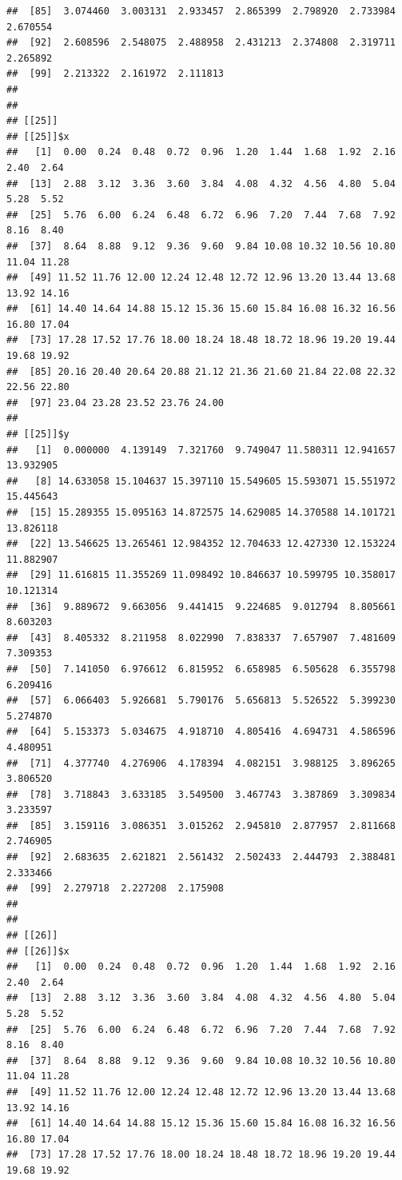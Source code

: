 \documentclass[
  ignorenonframetext,
]{beamer}
\begin{document}
\begin{frame}[fragile]{}
\begin{verbatim}
##  [85]  3.074460  3.003131  2.933457  2.865399  2.798920  2.733984  2.670554
##  [92]  2.608596  2.548075  2.488958  2.431213  2.374808  2.319711  2.265892
##  [99]  2.213322  2.161972  2.111813
## 
## 
## [[25]]
## [[25]]$x
##   [1]  0.00  0.24  0.48  0.72  0.96  1.20  1.44  1.68  1.92  2.16  2.40  2.64
##  [13]  2.88  3.12  3.36  3.60  3.84  4.08  4.32  4.56  4.80  5.04  5.28  5.52
##  [25]  5.76  6.00  6.24  6.48  6.72  6.96  7.20  7.44  7.68  7.92  8.16  8.40
##  [37]  8.64  8.88  9.12  9.36  9.60  9.84 10.08 10.32 10.56 10.80 11.04 11.28
##  [49] 11.52 11.76 12.00 12.24 12.48 12.72 12.96 13.20 13.44 13.68 13.92 14.16
##  [61] 14.40 14.64 14.88 15.12 15.36 15.60 15.84 16.08 16.32 16.56 16.80 17.04
##  [73] 17.28 17.52 17.76 18.00 18.24 18.48 18.72 18.96 19.20 19.44 19.68 19.92
##  [85] 20.16 20.40 20.64 20.88 21.12 21.36 21.60 21.84 22.08 22.32 22.56 22.80
##  [97] 23.04 23.28 23.52 23.76 24.00
## 
## [[25]]$y
##   [1]  0.000000  4.139149  7.321760  9.749047 11.580311 12.941657 13.932905
##   [8] 14.633058 15.104637 15.397110 15.549605 15.593071 15.551972 15.445643
##  [15] 15.289355 15.095163 14.872575 14.629085 14.370588 14.101721 13.826118
##  [22] 13.546625 13.265461 12.984352 12.704633 12.427330 12.153224 11.882907
##  [29] 11.616815 11.355269 11.098492 10.846637 10.599795 10.358017 10.121314
##  [36]  9.889672  9.663056  9.441415  9.224685  9.012794  8.805661  8.603203
##  [43]  8.405332  8.211958  8.022990  7.838337  7.657907  7.481609  7.309353
##  [50]  7.141050  6.976612  6.815952  6.658985  6.505628  6.355798  6.209416
##  [57]  6.066403  5.926681  5.790176  5.656813  5.526522  5.399230  5.274870
##  [64]  5.153373  5.034675  4.918710  4.805416  4.694731  4.586596  4.480951
##  [71]  4.377740  4.276906  4.178394  4.082151  3.988125  3.896265  3.806520
##  [78]  3.718843  3.633185  3.549500  3.467743  3.387869  3.309834  3.233597
##  [85]  3.159116  3.086351  3.015262  2.945810  2.877957  2.811668  2.746905
##  [92]  2.683635  2.621821  2.561432  2.502433  2.444793  2.388481  2.333466
##  [99]  2.279718  2.227208  2.175908
## 
## 
## [[26]]
## [[26]]$x
##   [1]  0.00  0.24  0.48  0.72  0.96  1.20  1.44  1.68  1.92  2.16  2.40  2.64
##  [13]  2.88  3.12  3.36  3.60  3.84  4.08  4.32  4.56  4.80  5.04  5.28  5.52
##  [25]  5.76  6.00  6.24  6.48  6.72  6.96  7.20  7.44  7.68  7.92  8.16  8.40
##  [37]  8.64  8.88  9.12  9.36  9.60  9.84 10.08 10.32 10.56 10.80 11.04 11.28
##  [49] 11.52 11.76 12.00 12.24 12.48 12.72 12.96 13.20 13.44 13.68 13.92 14.16
##  [61] 14.40 14.64 14.88 15.12 15.36 15.60 15.84 16.08 16.32 16.56 16.80 17.04
##  [73] 17.28 17.52 17.76 18.00 18.24 18.48 18.72 18.96 19.20 19.44 19.68 19.92

\end{verbatim}
\end{frame}
\end{document}
